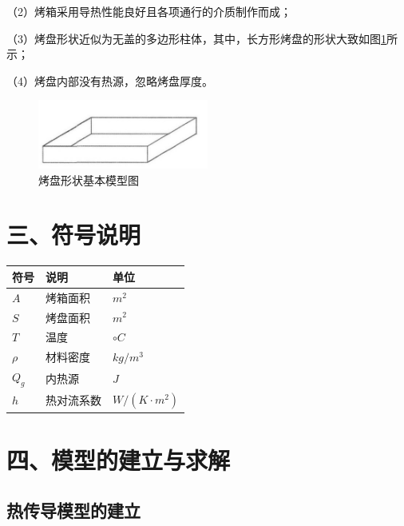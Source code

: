\documentclass{my_paper}
\begin{document}
（2）烤箱采用导热性能良好且各项通行的介质制作而成；

（3）烤盘形状近似为无盖的多边形柱体，其中，长方形烤盘的形状大致如图\ref{pan}所示；

（4）烤盘内部没有热源，忽略烤盘厚度。

\begin{figure}[h]
    \centering
    \includegraphics[width=0.5\textwidth]{pan.jpg}
    \caption{烤盘形状基本模型图}
    \label{pan}
\end{figure}

\newpage
\section{三、符号说明}
\begin{table}[h]%
    \centering
    \begin{tabular}{p{2.0cm}<{\centering}p{9.0cm}<{\centering}p{2.0cm}<{\centering}}
        \hline
        符号    & 说明       & 单位                 \\ %
        \hline
        $A$     & 烤箱面积   & $m^2$                \\
        $S$     & 烤盘面积   & $m^2$                \\
        $T$     & 温度       & $\circ C$            \\
        $\rho$  & 材料密度   & $kg/m^{3}$           \\
        $Q_{g}$ & 内热源     & $J$                  \\
        $h$     & 热对流系数 & $W/(K \cdot m^{2} )$ \\
        \hline
    \end{tabular}
\end{table}

\section{四、模型的建立与求解}

\subsection{热传导模型的建立}
\end{document}
